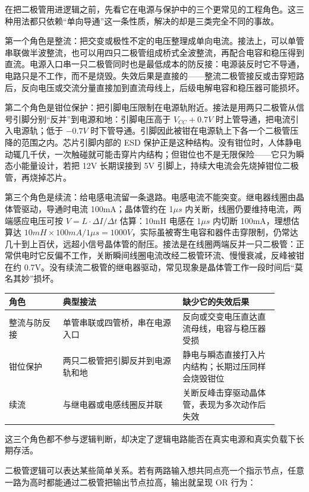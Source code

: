 在把二极管用进逻辑之前，先看它在电源与保护中的三个更常见的工程角色。这三种用法都只依赖“单向导通”这一条性质，解决的却是三类完全不同的事故。

第一个角色是整流：把交变或极性不定的电压整理成单向电流。接法上，可以单管串联做半波整流，也可以用四只二极管组成桥式全波整流，再配合电容和稳压得到直流。电源入口串一只二极管同时也是最低成本的防反接：电源装反时它不导通，电路只是不工作，而不是烧毁。失效后果是直接的——整流二极管接反或击穿短路后，反向电压或交流分量直接加到直流母线上，后级电解电容和稳压器可能损坏。

第二个角色是钳位保护：把引脚电压限制在电源轨附近。接法是用两只二极管从信号引脚分别“反并”到电源和地：引脚电压高于 $V_{CC}+0.7V$ 时上管导通，把电流引入电源轨；低于 $-0.7V$ 时下管导通。引脚因此被钳在电源轨上下各一个二极管压降的范围之内。芯片引脚内部的 ESD 保护正是这种结构。没有钳位时，人体静电动辄几千伏，一次触碰就可能击穿片内结构；但钳位也不是无限保险——它只为瞬态小能量设计，若把 12V 长期误接到 5V 引脚上，持续大电流会先烧掉钳位二极管，再烧掉芯片。

第三个角色是续流：给电感电流留一条退路。电感电流不能突变。继电器线圈由晶体管驱动，导通时电流 100mA；晶体管约在 1$\mu s$ 内关断，线圈仍要维持电流，两端感应电压可按 $V = L \cdot \Delta I / \Delta t$ 估算：10mH 电感在 1$\mu s$ 内切断 100mA，理想估算达 $10mH \times 100mA/1\mu s = 1000V$，实际虽被寄生电容和器件击穿限制，仍常达几十到上百伏，远超小信号晶体管的耐压。接法是在线圈两端反并一只二极管：正常供电时它反偏不工作，关断瞬间线圈电流改经二极管环流、慢慢衰减，反峰被钳在约 0.7V。没有续流二极管的继电器驱动，常见现象是晶体管工作一段时间后“莫名其妙”损坏。

\begin{longtable}{L{0.18\linewidth}L{0.4\linewidth}L{0.32\linewidth}}
\toprule
角色 & 典型接法 & 缺少它的失效后果 \\
\midrule
整流与防反接 & 单管串联或四管桥，串在电源入口 & 反向或交变电压直达直流母线，电容与稳压器受损 \\
钳位保护 & 两只二极管把引脚反并到电源轨和地 & 静电与瞬态直接打入片内结构；长期过压同样会烧毁钳位 \\
续流 & 与继电器或电感线圈反并联 & 关断反峰击穿驱动晶体管，表现为多次动作后失效 \\
\bottomrule
\end{longtable}

这三个角色都不参与逻辑判断，却决定了逻辑电路能否在真实电源和真实负载下长期存活。

二极管逻辑可以表达某些简单关系。若有两路输入想共同点亮一个指示节点，任意一路为高时都能通过二极管把输出节点拉高，输出就呈现 OR 行为：

